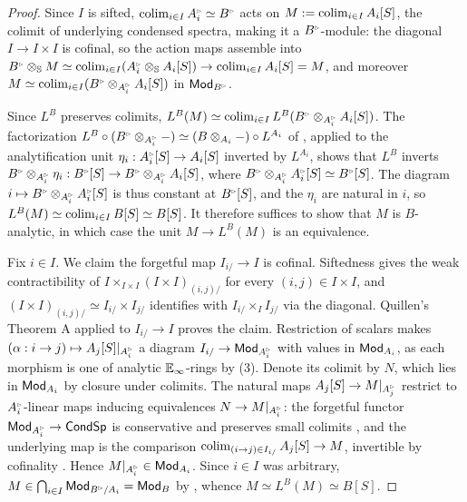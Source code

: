 \begin{proof}
    Since $I$ is sifted, $\colim_{i\in I}A_{i}^{\tri}\simeq B^{\tri}$ acts on $M:=\operatorname*{colim}_{i\in I}A_{i}[S]$, the colimit of underlying condensed spectra, making it a $B^{\tri}$-module: the diagonal $I\to I\times I$ is cofinal, so the action maps assemble into $B^{\tri}\otimes_{\Sph}M\simeq\colim_{i\in I}(A_{i}^{\tri}\otimes_{\Sph}A_{i}[S])\to\colim_{i\in I}A_{i}[S]=M$, and moreover $M\simeq\colim_{i\in I}(B^{\tri}\otimes_{A_{i}^{\tri}}A_{i}[S])$ in $\Mod_{B^{\tri}}$.

    Since $L^{B}$ preserves colimits, $L^{B}(M)\simeq\colim_{i\in I}L^{B}(B^{\tri}\otimes_{A_{i}^{\tri}}A_{i}[S])$. The factorization $L^{B}\circ(B^{\tri}\otimes_{A_{i}^{\tri}}-)\simeq(B\otimes_{A_{i}}-)\circ L^{A_{i}}$ of , applied to the analytification unit $\eta_{i}: A_{i}^{\tri}[S]\to A_{i}[S]$ inverted by $L^{A_{i}}$, shows that $L^{B}$ inverts $B^{\tri}\otimes_{A_{i}^{\tri}}\eta_{i}: B^{\tri}[S]\to B^{\tri}\otimes_{A_{i}^{\tri}}A_{i}[S]$, where $B^{\tri}\otimes_{A_{i}^{\tri}}A_{i}^{\tri}[S]\simeq B^{\tri}[S]$. The diagram $i\mapsto B^{\tri}\otimes_{A_{i}^{\tri}}A_{i}^{\tri}[S]$ is thus constant at $B^{\tri}[S]$, and the $\eta_{i}$ are natural in $i$, so $L^{B}(M)\simeq\operatorname*{colim}_{i\in I}B[S]\simeq B[S]$. It therefore suffices to show that $M$ is $B$-analytic, in which case the unit $M\to L^{B}(M)$ is an equivalence.

    Fix $i\in I$. We claim the forgetful map $I_{i/}\to I$ is cofinal. Siftedness gives the weak contractibility of $I\times_{I\times I}(I\times I)_{(i,j)/}$ for every $(i,j)\in I\times I$, and $(I\times I)_{(i,j)/}\simeq I_{i/}\times I_{j/}$ identifies with $I_{i/}\times_{I}I_{j/}$ via the diagonal. Quillen's Theorem A \cite[Thm. 4.1.3.1]{HTT} applied to $I_{i/}\to I$ proves the claim. Restriction of scalars makes $(\alpha: i\to j)\mapsto A_{j}[S]|_{A_{i}^{\tri}}$ a diagram $I_{i/}\to\Mod_{A_{i}^{\tri}}$ with values in $\mathsf{Mod}_{A_{i}}$, as each morphism is one of analytic $\mathbb{E}_{\infty}$-rings by  (3). Denote its colimit by $N$, which lies in $\mathsf{Mod}_{A_{i}}$ by closure under colimits. The natural maps $A_{j}[S]\to M|_{A_{j}^{\tri}}$ restrict to $A_{i}^{\tri}$-linear maps inducing equivalences $N\to M|_{A_{i}^{\tri}}$: the forgetful functor $\Mod_{A_{i}^{\tri}}\to\Cond\Sp$ is conservative and preserves small colimits \cite[Cor. 4.2.3.5]{HA}, and the underlying map is the comparison $\operatorname*{colim}_{(i\to j)\in I_{i/}}A_{j}[S]\to M$, invertible by cofinality \cite[Prop. 4.1.1.8]{HTT}. Hence $M|_{A_{i}^{\tri}}\in\Mod_{A_{i}}$. Since $i\in I$ was arbitrary, $M\in\bigcap_{i\in I}\Mod_{B^{\tri}/A_{i}}=\Mod_{B}$ by , whence $M\simeq L^{B}(M)\simeq B[S]$. 
\end{proof}
